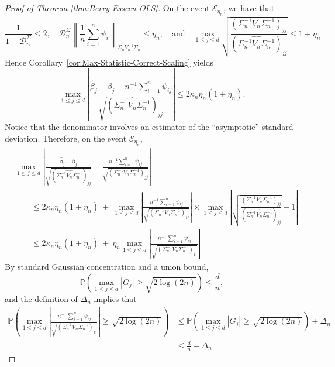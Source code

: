 \documentclass[11pt]{article}
\begin{document}
\begin{appendices}
\begin{proof}[Proof of Theorem \ref{thm:Berry-Esseen-OLS}]
On the event $\mathcal{E}_{\eta_n}$, we have that
\[
\frac{1}{1 - \mathcal{D}_n^{\Sigma}} \le 2,\quad \mathcal{D}_n^{\Sigma}\left\|\frac{1}{n}\sum_{i=1}^n \psi_i\right\|_{\Sigma_n V^{-1}_n\Sigma_n} \le \eta_n,\quad\mbox{and}\quad \max_{1\le j\le d}\sqrt{\frac{(\Sigma_n^{-1}V_n\Sigma_n^{-1})_{jj}}{(\widehat{\Sigma_n^{-1}V_n\Sigma_n^{-1}})_{jj}}} \le 1 + \eta_n.
\]
Hence Corollary~\ref{cor:Max-Statistic-Correct-Scaling} yields
\[
\max_{1\le j\le d}\left|\frac{\widehat{\beta}_j - \beta_j - n^{-1}\sum_{i=1}^n \psi_{ij}}{\sqrt{(\widehat{\Sigma_n^{-1}V_n\Sigma_n^{-1}})_{jj}}}\right| \le 2\kappa_n\eta_n{(1 + \eta_n)}.
\]
Notice that the denominator involves an estimator of the ``asymptotic'' standard deviation. Therefore, on the event $\mathcal{E}_{\eta_n}$,
\begin{align*}
&\max_{1\le j\le d}\left|\frac{\widehat{\beta}_j - \beta_j}{\sqrt{(\widehat{\Sigma_n^{-1}V_n\Sigma_n^{-1}})_{jj}}} - \frac{n^{-1}\sum_{i=1}^n \psi_{ij}}{\sqrt{(\Sigma_n^{-1}V_n\Sigma_n^{-1})_{jj}}}\right|\\ 
&\qquad\le 2\kappa_n\eta_n(1 + \eta_n) ~+~ \max_{1\le j\le d}\left|\frac{n^{-1}\sum_{i=1}^n \psi_{ij}}{\sqrt{(\Sigma_n^{-1}V_n\Sigma_n^{-1})_{jj}}}\right|\times\max_{1\le j\le d}\left|\sqrt{\frac{(\Sigma_n^{-1}V_n\Sigma_n^{-1})_{jj}}{(\widehat{\Sigma_n^{-1}V_n\Sigma_n^{-1}})_{jj}}} - 1\right|\\
&\qquad\le 2\kappa_n\eta_n(1 + \eta_n) ~+~ \eta_n\max_{1\le j\le d}\left|\frac{n^{-1}\sum_{i=1}^n \psi_{ij}}{\sqrt{(\Sigma_n^{-1}V_n\Sigma_n^{-1})_{jj}}}\right|
\end{align*}
By standard Gaussian concentration and a union bound,
\[
\mathbb{P}\left(\max_{1\le j\le d}|G_j| \ge \sqrt{2\log(2 n  )}\right) \le \frac{d}{n},
\]
and the definition of $\Delta_n$ implies that
\begin{align*}
\mathbb{P}\left(\max_{1\le j\le d}\left|\frac{n^{-1}\sum_{i=1}^n \psi_{ij}}{\sqrt{(\Sigma_n^{-1}V_n\Sigma_n^{-1})_{jj}}}\right| \ge \sqrt{2\log(2n)}\right) &\le \mathbb{P}\left(\max_{1\le j\le d}|G_j| \ge \sqrt{2\log(2n)}\right) + \Delta_n\\
&\le \frac{d}{n} + \Delta_n.
\end{align*}

\end{proof}
\end{appendices}
\end{document}
